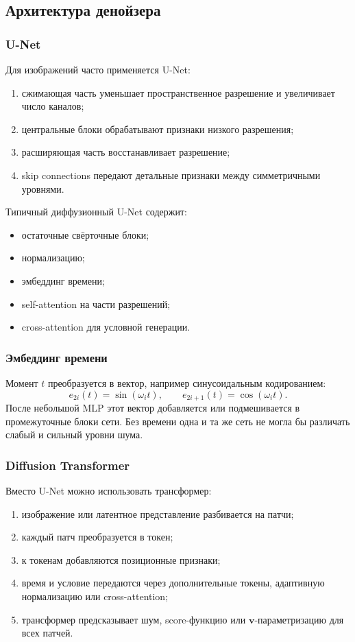 \documentclass[12pt,a4paper]{article}
\theoremstyle{definition}
\newcommand{\1}{\mathbf{1}}
\begin{document}
\subsection{Архитектура денойзера}

\subsubsection{U-Net}

Для изображений часто применяется U-Net:
\begin{enumerate}
    \item сжимающая часть уменьшает пространственное разрешение и
    увеличивает число каналов;
    \item центральные блоки обрабатывают признаки низкого разрешения;
    \item расширяющая часть восстанавливает разрешение;
    \item skip connections передают детальные признаки между
    симметричными уровнями.
\end{enumerate}

Типичный диффузионный U-Net содержит:
\begin{itemize}
    \item остаточные свёрточные блоки;
    \item нормализацию;
    \item эмбеддинг времени;
    \item self-attention на части разрешений;
    \item cross-attention для условной генерации.
\end{itemize}

\subsubsection{Эмбеддинг времени}

Момент $t$ преобразуется в вектор, например синусоидальным
кодированием:
\[
    e_{2i}(t)
    =
    \sin(\omega_i t),
    \qquad
    e_{2i+1}(t)
    =
    \cos(\omega_i t).
\]
После небольшой MLP этот вектор добавляется или подмешивается в
промежуточные блоки сети. Без времени одна и та же сеть не могла бы
различать слабый и сильный уровни шума.

\subsubsection{Diffusion Transformer}

Вместо U-Net можно использовать трансформер:
\begin{enumerate}
    \item изображение или латентное представление разбивается на
    патчи;
    \item каждый патч преобразуется в токен;
    \item к токенам добавляются позиционные признаки;
    \item время и условие передаются через дополнительные токены,
    адаптивную нормализацию или cross-attention;
    \item трансформер предсказывает шум, score-функцию или
    $\bm{v}$-параметризацию для всех патчей.
\end{enumerate}
\end{document}
